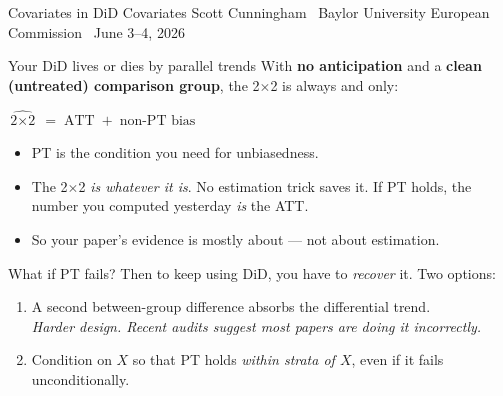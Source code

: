 \documentclass[aspectratio=169,11pt]{beamer}
\begin{document}

\codechellatitle
  {Covariates in DiD}
  {Covariates}
  {Scott Cunningham \textperiodcentered\ Baylor University}
  {European Commission \textperiodcentered\ June 3--4, 2026}

\begin{frame}{Your DiD lives or dies by parallel trends}
\vspace{0.5em}
With \textbf{no anticipation} and a \textbf{clean (untreated) comparison group}, the 2$\times$2 is always and only:
\vspace{0.3em}
\begin{center}
\Large
$\widehat{\text{2}\times\text{2}} \;=\; \text{ATT} \;+\; \text{non-PT bias}$
\end{center}
\vspace{0.4em}
\begin{itemize}
  \item PT is the  condition you need for unbiasedness.
  \item The 2$\times$2 \textit{is whatever it is}. No estimation trick saves it. If PT holds, the number you computed yesterday \textit{is} the ATT.
  \item So your paper's evidence is mostly about  --- not about estimation.
\end{itemize}
\end{frame}

\begin{frame}{What if PT fails?}
\vspace{0.5em}
Then to keep using DiD, you have to \textit{recover} it. Two options:
\vspace{0.5em}
\begin{enumerate}\setlength\itemsep{0.5em}
  \item {} A second between-group difference absorbs the differential trend. \\
        \textit{Harder design. Recent audits suggest most papers are doing it incorrectly.}
  \item {} Condition on $X$ so that PT holds \textit{within strata of $X$}, even if it fails unconditionally.
\end{enumerate}
\vspace{0.7em}
\end{frame}
\end{document}
